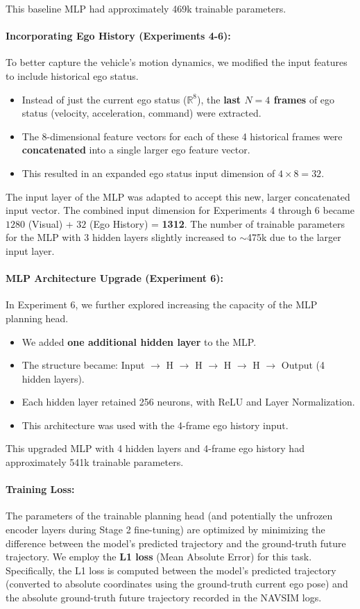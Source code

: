 \documentclass{article}
\begin{document}
This baseline MLP had approximately 469k trainable parameters.

\paragraph{Incorporating Ego History (Experiments 4-6):}
To better capture the vehicle's motion dynamics, we modified the input features to include historical ego status.
\begin{itemize}
    \item Instead of just the current ego status ($\mathbb{R}^{8}$), the \textbf{last $N=4$ frames} of ego status (velocity, acceleration, command) were extracted.
    \item The 8-dimensional feature vectors for each of these 4 historical frames were \textbf{concatenated} into a single larger ego feature vector.
    \item This resulted in an expanded ego status input dimension of $4 \times 8 = 32$.
\end{itemize}
The input layer of the MLP was adapted to accept this new, larger concatenated input vector. The combined input dimension for Experiments 4 through 6 became $1280$ (Visual) + $32$ (Ego History) = \textbf{1312}. The number of trainable parameters for the MLP with 3 hidden layers slightly increased to $\sim$475k due to the larger input layer.

\paragraph{MLP Architecture Upgrade (Experiment 6):}
In Experiment 6, we further explored increasing the capacity of the MLP planning head.
\begin{itemize}
    \item We added \textbf{one additional hidden layer} to the MLP.
    \item The structure became: Input $\rightarrow$ H $\rightarrow$ H $\rightarrow$ H $\rightarrow$ H $\rightarrow$ Output (4 hidden layers).
    \item Each hidden layer retained 256 neurons, with ReLU and Layer Normalization.
    \item This architecture was used with the 4-frame ego history input.
\end{itemize}
This upgraded MLP with 4 hidden layers and 4-frame ego history had approximately 541k trainable parameters.

\paragraph{Training Loss:}
The parameters of the trainable planning head (and potentially the unfrozen encoder layers during Stage 2 fine-tuning) are optimized by minimizing the difference between the model's predicted trajectory and the ground-truth future trajectory. We employ the \textbf{L1 loss} (Mean Absolute Error) for this task. Specifically, the L1 loss is computed between the model's predicted trajectory (converted to absolute coordinates using the ground-truth current ego pose) and the absolute ground-truth future trajectory recorded in the NAVSIM logs.
\end{document}
